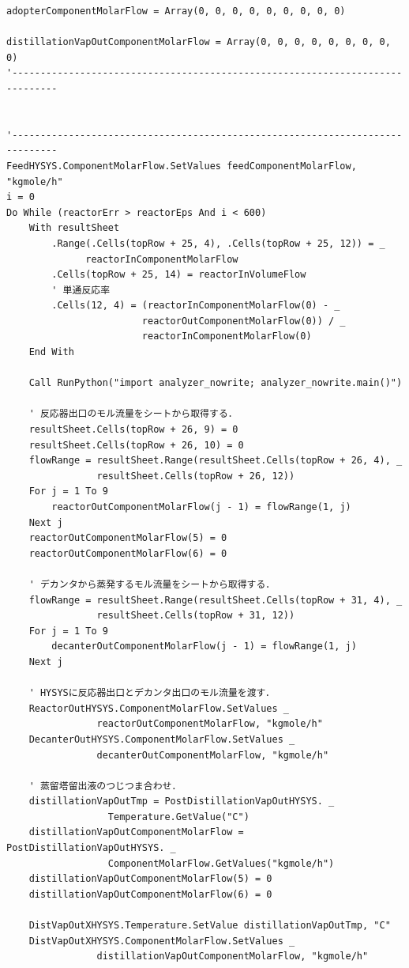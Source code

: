 \documentclass[a4j]{jsreport}
\begin{document}
\begin{lstlisting}[caption=HYSYSとpythonを繋ぐコード]
adopterComponentMolarFlow = Array(0, 0, 0, 0, 0, 0, 0, 0, 0)

distillationVapOutComponentMolarFlow = Array(0, 0, 0, 0, 0, 0, 0, 0, 0)
'------------------------------------------------------------------------------


'------------------------------------------------------------------------------
FeedHYSYS.ComponentMolarFlow.SetValues feedComponentMolarFlow, "kgmole/h"
i = 0
Do While (reactorErr > reactorEps And i < 600)
    With resultSheet
        .Range(.Cells(topRow + 25, 4), .Cells(topRow + 25, 12)) = _
              reactorInComponentMolarFlow
        .Cells(topRow + 25, 14) = reactorInVolumeFlow
        ' 単通反応率
        .Cells(12, 4) = (reactorInComponentMolarFlow(0) - _
                        reactorOutComponentMolarFlow(0)) / _
                        reactorInComponentMolarFlow(0)
    End With

    Call RunPython("import analyzer_nowrite; analyzer_nowrite.main()")

    ' 反応器出口のモル流量をシートから取得する．
    resultSheet.Cells(topRow + 26, 9) = 0
    resultSheet.Cells(topRow + 26, 10) = 0
    flowRange = resultSheet.Range(resultSheet.Cells(topRow + 26, 4), _
                resultSheet.Cells(topRow + 26, 12))
    For j = 1 To 9
        reactorOutComponentMolarFlow(j - 1) = flowRange(1, j)
    Next j
    reactorOutComponentMolarFlow(5) = 0
    reactorOutComponentMolarFlow(6) = 0

    ' デカンタから蒸発するモル流量をシートから取得する．
    flowRange = resultSheet.Range(resultSheet.Cells(topRow + 31, 4), _
                resultSheet.Cells(topRow + 31, 12))
    For j = 1 To 9
        decanterOutComponentMolarFlow(j - 1) = flowRange(1, j)
    Next j

    ' HYSYSに反応器出口とデカンタ出口のモル流量を渡す．
    ReactorOutHYSYS.ComponentMolarFlow.SetValues _
                reactorOutComponentMolarFlow, "kgmole/h"
    DecanterOutHYSYS.ComponentMolarFlow.SetValues _
                decanterOutComponentMolarFlow, "kgmole/h"

    ' 蒸留塔留出液のつじつま合わせ．
    distillationVapOutTmp = PostDistillationVapOutHYSYS. _
                  Temperature.GetValue("C")
    distillationVapOutComponentMolarFlow = PostDistillationVapOutHYSYS. _
                  ComponentMolarFlow.GetValues("kgmole/h")
    distillationVapOutComponentMolarFlow(5) = 0
    distillationVapOutComponentMolarFlow(6) = 0

    DistVapOutXHYSYS.Temperature.SetValue distillationVapOutTmp, "C"
    DistVapOutXHYSYS.ComponentMolarFlow.SetValues _
                distillationVapOutComponentMolarFlow, "kgmole/h"



\end{lstlisting}
\end{document}
